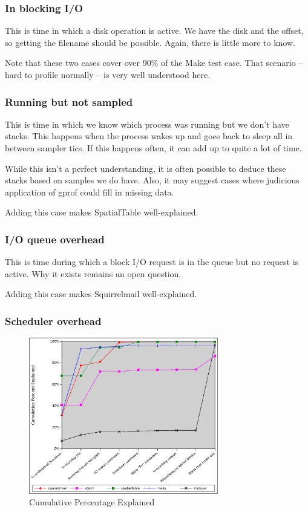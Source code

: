 \documentclass[10pt]{article}
\begin{document}
\subsubsection{In blocking I/O}

This is time in which a disk operation is active.  We have the disk and the offset, so getting the filename should be possible.  Again, there is little more to know.

Note that these two cases cover over 90\% of the Make test case.  That scenario -- hard to profile normally -- is very well understood here.

\subsubsection{Running but not sampled}

This is time in which we know which process was running but we don't have stacks.  This happens when the process wakes up and goes back to sleep all in between sampler tics.  If this happens often, it can add up to quite a lot of time.

While this isn't a perfect understanding, it is often possible to deduce these stacks based on samples we do have.  Also, it may suggest cases where judicious application of gprof could fill in missing data.

Adding this case makes SpatialTable well-explained.

\subsubsection{I/O queue overhead}

This is time during which a block I/O request is in the queue but no request is active.  Why it exists remains an open question.

Adding this case makes Squirrelmail well-explained.

\subsubsection{Scheduler overhead}
\begin{figure}[b!]
\includegraphics[width=3.25in]{5cumugraph}
\caption{Cumulative Percentage Explained}
\label{fig:resgraph}
\end{figure}
\end{document}

